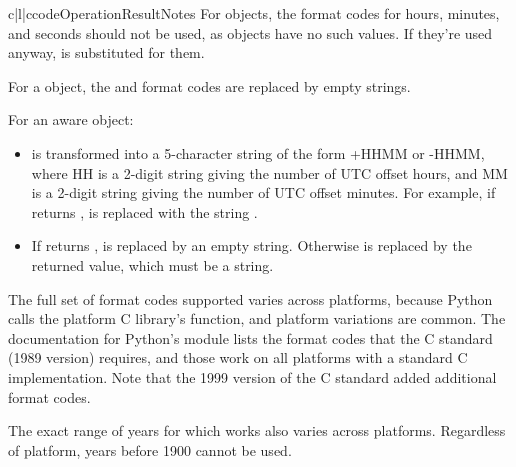 \begin{tableiii}{c|l|c}{code}{Operation}{Result}{Notes}
For  objects, the format codes for hours, minutes, and
seconds should not be used, as  objects have no such
values.  If they're used anyway,  is substituted for them.

For a {\naive} object, the  and  format codes are
replaced by empty strings.

For an aware object:

\begin{itemize}
  \item[\code{\%z}]
     is transformed into a 5-character string of
    the form +HHMM or -HHMM, where HH is a 2-digit string giving the
    number of UTC offset hours, and MM is a 2-digit string giving the
    number of UTC offset minutes.  For example, if
     returns ,
     is replaced with the string .

  \item[\code{\%Z}]
    If  returns ,  is replaced
    by an empty string.  Otherwise  is replaced by the returned
    value, which must be a string.
\end{itemize}

The full set of format codes supported varies across platforms,
because Python calls the platform C library's 
function, and platform variations are common.  The documentation for
Python's  module lists the format codes that the C
standard (1989 version) requires, and those work on all platforms
with a standard C implementation.  Note that the 1999 version of the
C standard added additional format codes.

The exact range of years for which  works also
varies across platforms.  Regardless of platform, years before 1900
cannot be used.


\begin{comment}

\subsection{C API}

Struct typedefs:

    PyDateTime_Date
    PyDateTime_DateTime
    PyDateTime_DateTimeTZ
    PyDateTime_Time
    PyDateTime_TimeTZ
    PyDateTime_Delta
    PyDateTime_TZInfo

Type-check macros:


\end{comment}
\end{tableiii}
